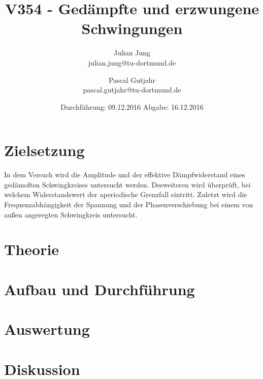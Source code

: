 

\title{V354 - Gedämpfte und erzwungene Schwingungen}
\author{Julian Jung \\ julian.jung@tu-dortmund.de
  \and Pascal Gutjahr \\ pascal.gutjahr@tu-dortmund.de}
  \date{Durchführung: 09.12.2016
  \hspace{3em}
  Abgabe: 16.12.2016}
  
\maketitle
\newpage
\tableofcontents
\newpage
\section{Zielsetzung}
In dem Versuch wird die Amplitude und der effektive Dämpfwiderstand eines
gedämoften Schwingkreises untersucht werden. Desweiteren wird überprüft, bei
welchem Widerstandswert der aperiodische Grenzfall eintritt. Zuletzt wird die
Frequenzabhängigkeit der Spannung und der Phasenverschiebung bei einem von
außen angeregten Schwingkreis untersucht.
\section{Theorie}
\section{Aufbau und Durchführung}
\section{Auswertung}
\section{Diskussion}
% 
\printbibliography

